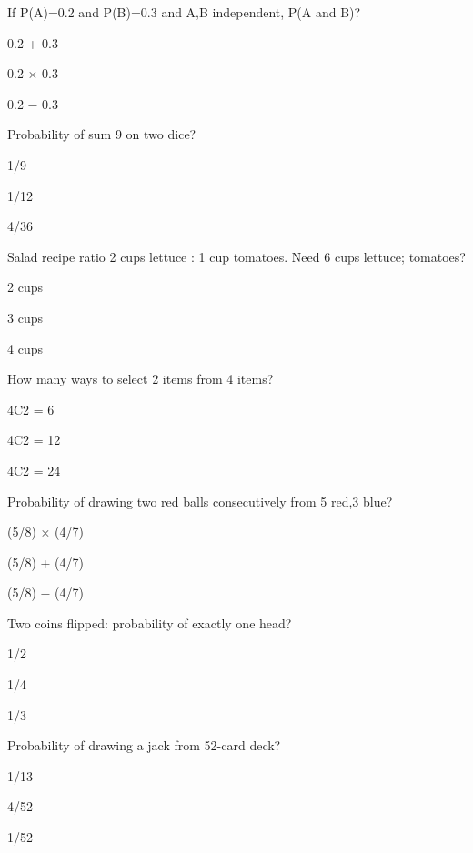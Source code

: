 \begin{enhancedmcq}{If P(A)=0.2 and P(B)=0.3 and A,B independent, P(A and B)?}
\item 0.2 + 0.3
\item 0.2 × 0.3
\item 0.2 − 0.3

\end{enhancedmcq}
\begin{enhancedmcq}{Probability of sum 9 on two dice?}
\item 1/9
\item 1/12
\item 4/36

\end{enhancedmcq}
\begin{enhancedmcq}{Salad recipe ratio 2 cups lettuce : 1 cup tomatoes. Need 6 cups lettuce; tomatoes?}
\item 2 cups
\item 3 cups
\item 4 cups

\end{enhancedmcq}
\begin{enhancedmcq}{How many ways to select 2 items from 4 items?}
\item 4C2 = 6
\item 4C2 = 12
\item 4C2 = 24

\end{enhancedmcq}
\begin{enhancedmcq}{Probability of drawing two red balls consecutively from 5 red,3 blue?}
\item (5/8) × (4/7)
\item (5/8) + (4/7)
\item (5/8) − (4/7)

\end{enhancedmcq}
\begin{enhancedmcq}{Two coins flipped: probability of exactly one head?}
\item 1/2
\item 1/4
\item 1/3

\end{enhancedmcq}
\begin{enhancedmcq}{Probability of drawing a jack from 52-card deck?}
\item 1/13
\item 4/52
\item 1/52

\end{enhancedmcq}
